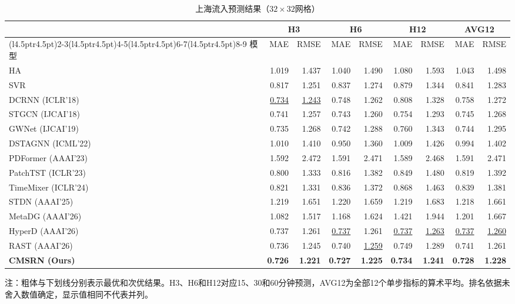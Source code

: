 \begin{table}[!htbp]
\centering
\caption{上海流入预测结果（\(32\times32\)网格）}
\label{tab:shanghai-inflow}
\begingroup
\linespread{1}\fontsize{10}{12}\selectfont
\setlength{\tabcolsep}{4.5pt}
\renewcommand{\arraystretch}{1.05}
\begin{tabular*}{\linewidth}{@{\extracolsep{\fill}}l*{8}{r}@{}}
\toprule
& \multicolumn{2}{c}{H3} & \multicolumn{2}{c}{H6} & \multicolumn{2}{c}{H12} & \multicolumn{2}{c}{AVG12} \\
\cmidrule(l{4.5pt}r{4.5pt}){2-3}\cmidrule(l{4.5pt}r{4.5pt}){4-5}\cmidrule(l{4.5pt}r{4.5pt}){6-7}\cmidrule(l{4.5pt}r{4.5pt}){8-9}
模型 & MAE & RMSE & MAE & RMSE & MAE & RMSE & MAE & RMSE \\
\midrule
HA & 1.019 & 1.437 & 1.040 & 1.490 & 1.080 & 1.593 & 1.043 & 1.498 \\
SVR & 0.817 & 1.251 & 0.837 & 1.274 & 0.879 & 1.344 & 0.841 & 1.283 \\
DCRNN (ICLR'18) & \underline{0.734} & \underline{1.243} & 0.748 & 1.262 & 0.808 & 1.328 & 0.758 & 1.272 \\
STGCN (IJCAI'18) & 0.741 & 1.257 & 0.743 & 1.260 & 0.754 & 1.293 & 0.745 & 1.268 \\
GWNet (IJCAI'19) & 0.735 & 1.268 & 0.742 & 1.288 & 0.760 & 1.343 & 0.744 & 1.295 \\
DSTAGNN (ICML'22) & 1.010 & 1.410 & 0.950 & 1.360 & 1.009 & 1.426 & 0.994 & 1.402 \\
PDFormer (AAAI'23) & 1.592 & 2.472 & 1.591 & 2.471 & 1.589 & 2.468 & 1.591 & 2.471 \\
PatchTST (ICLR'23) & 0.800 & 1.333 & 0.816 & 1.382 & 0.849 & 1.480 & 0.819 & 1.392 \\
TimeMixer (ICLR'24) & 0.821 & 1.331 & 0.836 & 1.372 & 0.868 & 1.463 & 0.839 & 1.381 \\
STDN (AAAI'25) & 1.219 & 1.651 & 1.220 & 1.659 & 1.219 & 1.683 & 1.218 & 1.661 \\
MetaDG (AAAI'26) & 1.082 & 1.517 & 1.168 & 1.624 & 1.421 & 1.944 & 1.201 & 1.667 \\
HyperD (AAAI'26) & 0.737 & 1.261 & \underline{0.737} & 1.261 & \underline{0.737} & \underline{1.263} & \underline{0.737} & \underline{1.260} \\
RAST (AAAI'26) & 0.736 & 1.245 & 0.740 & \underline{1.259} & 0.749 & 1.289 & 0.741 & 1.261 \\
\midrule
\textbf{CMSRN (Ours)} & \textbf{0.726} & \textbf{1.221} & \textbf{0.727} & \textbf{1.225} & \textbf{0.734} & \textbf{1.241} & \textbf{0.728} & \textbf{1.228} \\
\bottomrule
\end{tabular*}
\endgroup
\par\smallskip
\begin{minipage}{\linewidth}
\footnotesize\linespread{1.1}\selectfont\raggedright
注：粗体与下划线分别表示最优和次优结果。H3、H6和H12对应15、30和60分钟预测，AVG12为全部12个单步指标的算术平均。排名依据未舍入数值确定，显示值相同不代表并列。
\end{minipage}
\end{table}
